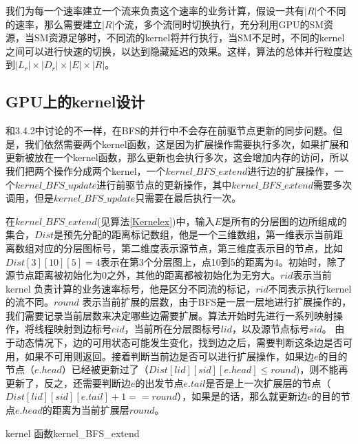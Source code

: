 我们为每一个速率建立一个流来负责这个速率的业务计算，假设一共有$|R|$个不同的速率，那么需要建立$|R|$个流，多个流同时切换执行，充分利用GPU的SM资源，当SM资源足够时，不同流的kernel将并行执行，当SM不足时，不同的kernel之间可以进行快速的切换，以达到隐藏延迟的效果。这样，算法的总体并行粒度达到$|L_r|\times|D_r|\times|E|\times|R|$。

\subsection{GPU上的kernel设计}
和3.4.2中讨论的不一样，在BFS的并行中不会存在前驱节点更新的同步问题。但是，我们依然需要两个kernel函数，这是因为扩展操作需要执行多次，如果扩展和更新被放在一个kernel函数，那么更新也会执行多次，这会增加内存的访问，所以我们把两个操作分成两个kernel，一个$kernel\_BFS\_extend$进行边的扩展操作，一个$kernel\_BFS\_update$进行前驱节点的更新操作，其中$kernel\_BFS\_extend$需要多次调用，但是$kernel\_BFS\_update$只需要在最后执行一次。

在$kernel\_BFS\_extend$(见算法\ref{Kernelex})中，输入$E$是所有的分层图的边所组成的集合，$Dist$是预先分配的距离标记数组，他是一个三维数组，第一维表示当前距离数组对应的分层图标号，第二维度表示源节点，第三维度表示目的节点，比如$Dist[3][10][5]=4$表示在第3个分层图上，点10到5的距离为4。初始时，除了源节点距离被初始化为0之外，其他的距离都被初始化为无穷大。$rid$表示当前kernel 负责计算的业务速率标号，他是区分不同流的标记，$rid$不同表示执行kernel的流不同。$round$ 表示当前扩展的层数，由于BFS是一层一层地进行扩展操作的，我们需要记录当前层数来决定哪些边需要扩展。算法开始时先进行一系列映射操作，将线程映射到边标号$eid$，当前所在分层图标号$lid$，以及源节点标号$sid$。 由于动态情况下，边的可用状态可能发生变化，找到边之后，需要判断这条边是否可用，如果不可用则返回。接着判断当前边是否可以进行扩展操作，如果边$e$的目的节点（$e.head$）已经被更新过了（$Dist[lid][sid][e.head] \le round$)，则不能再更新了，反之，还需要判断边$e$的出发节点$e.tail$是否是上一次扩展层的节点（$Dist[lid][sid][e.tail]+1==round$），如果是的话，那么就更新边$e$的目的节点$e.head$的距离为当前扩展层$round$。
\begin{algorithm}[t]
\begin{algorithmic}[1]
\EndIf
{}
\EndIf
\EndFunction
\end{algorithmic}
\caption{kernel 函数kernel\_BFS\_extend}
\label{Kernelex}
\end{algorithm}



